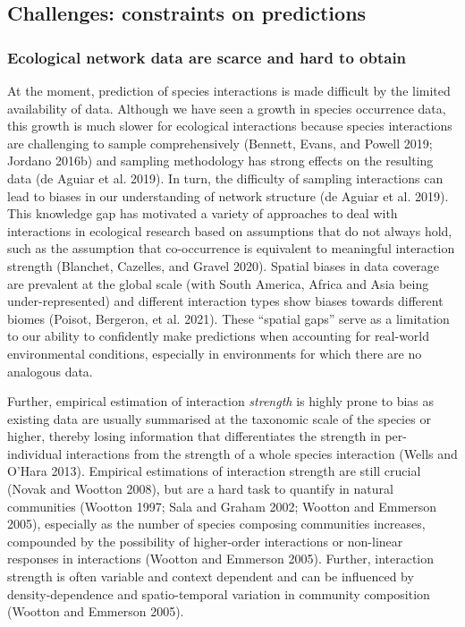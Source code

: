 \documentclass[10pt,oneside]{article}
\begin{document}
\hypertarget{challenges-constraints-on-predictions}{%
\subsection{Challenges: constraints on
predictions}\label{challenges-constraints-on-predictions}}

\hypertarget{ecological-network-data-are-scarce-and-hard-to-obtain}{%
\subsubsection{Ecological network data are scarce and hard to
obtain}\label{ecological-network-data-are-scarce-and-hard-to-obtain}}

At the moment, prediction of species interactions is made difficult by
the limited availability of data. Although we have seen a growth in
species occurrence data, this growth is much slower for ecological
interactions because species interactions are challenging to sample
comprehensively (Bennett, Evans, and Powell 2019; Jordano 2016b) and
sampling methodology has strong effects on the resulting data (de Aguiar
et al. 2019). In turn, the difficulty of sampling interactions can lead
to biases in our understanding of network structure (de Aguiar et al.
2019). This knowledge gap has motivated a variety of approaches to deal
with interactions in ecological research based on assumptions that do
not always hold, such as the assumption that co-occurrence is equivalent
to meaningful interaction strength (Blanchet, Cazelles, and Gravel
2020). Spatial biases in data coverage are prevalent at the global scale
(with South America, Africa and Asia being under-represented) and
different interaction types show biases towards different biomes
(Poisot, Bergeron, et al. 2021). These ``spatial gaps'' serve as a
limitation to our ability to confidently make predictions when
accounting for real-world environmental conditions, especially in
environments for which there are no analogous data.

Further, empirical estimation of interaction \emph{strength} is highly
prone to bias as existing data are usually summarised at the taxonomic
scale of the species or higher, thereby losing information that
differentiates the strength in per-individual interactions from the
strength of a whole species interaction (Wells and O'Hara 2013).
Empirical estimations of interaction strength are still crucial (Novak
and Wootton 2008), but are a hard task to quantify in natural
communities (Wootton 1997; Sala and Graham 2002; Wootton and Emmerson
2005), especially as the number of species composing communities
increases, compounded by the possibility of higher-order interactions or
non-linear responses in interactions (Wootton and Emmerson 2005).
Further, interaction strength is often variable and context dependent
and can be influenced by density-dependence and spatio-temporal
variation in community composition (Wootton and Emmerson 2005).
\end{document}
